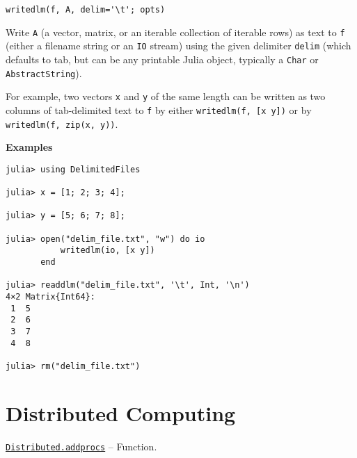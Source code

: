 \begin{adjustwidth}{2em}{0pt}


\begin{verbatim}
writedlm(f, A, delim='\t'; opts)
\end{verbatim}

Write \texttt{A} (a vector, matrix, or an iterable collection of iterable rows) as text to \texttt{f} (either a filename string or an \texttt{IO} stream) using the given delimiter \texttt{delim} (which defaults to tab, but can be any printable Julia object, typically a \texttt{Char} or \texttt{AbstractString}).

For example, two vectors \texttt{x} and \texttt{y} of the same length can be written as two columns of tab-delimited text to \texttt{f} by either \texttt{writedlm(f, [x y])} or by \texttt{writedlm(f, zip(x, y))}.

\textbf{Examples}


\begin{verbatim}
julia> using DelimitedFiles

julia> x = [1; 2; 3; 4];

julia> y = [5; 6; 7; 8];

julia> open("delim_file.txt", "w") do io
           writedlm(io, [x y])
       end

julia> readdlm("delim_file.txt", '\t', Int, '\n')
4×2 Matrix{Int64}:
 1  5
 2  6
 3  7
 4  8

julia> rm("delim_file.txt")
\end{verbatim}



\end{adjustwidth}

\hypertarget{16003170437967103399}{}


\chapter{Distributed Computing}


\hypertarget{2657399037748470653}{}
\hyperlink{2657399037748470653}{\texttt{Distributed.addprocs}}  -- {Function.}

